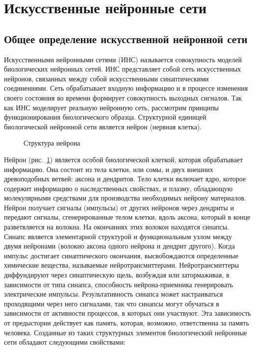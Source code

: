 \section{Искусственные нейронные сети}
\subsection{Общее определение искусственной нейронной сети}

Искусственными нейронными сетями (ИНС) называется совокупность моделей биологических нейронных сетей.
ИНС представляет собой сеть искусственных нейронов, связанных между собой искусственными синаптическими соединениями.
Сеть обрабатывает входную информацию и в процессе изменения своего состояния во времени формирует совокупность выходных сигналов.\cite{COURSE}
Так как ИНС моделирует реальную нейронную сеть, рассмотрим принципы функционирования биологического образца.
Структурной единицей биологической нейронной сети является нейрон (нервная клетка).
\begin{figure}[h]
\caption{Структура нейрона}
\label{ris:neuron}
\end{figure}
Нейрон (рис.~\ref{ris:neuron}) является особой биологической клеткой, которая обрабатывает информацию.
Она состоит из тела клетки, или сомы, и двух внешних древоподобных ветвей: аксона и дендритов.
Тело клетки включает ядро, которое содержит информацию о наследственных свойствах, и плазму, обладающую молекулярными средствами для производства необходимых нейрону материалов.
Нейрон получает сигналы (импульсы) от других нейронов через дендриты и передают сигналы, сгенерированные телом клетки, вдоль аксона, который в конце разветвляется на волокна.
На окончаниях этих волокон находятся синапсы. 
Синапс является элементарной структурой и функциональным узлом между двумя нейронами (волокно аксона одного нейрона и дендрит другого).
Когда импульс достигает синаптического окончания, высвобождаются определенные химические вещества, называемые нейротрансмиттерами.
Нейротрансмиттеры диффундируют через синаптическую щель, возбуждая или затормаживая, в зависимости от типа синапса, способность нейрона-приемника генерировать электрические импульсы.
Результативность синапса может настраиваться проходящими через него сигналами, так что синапсы могут обучаться в зависимости от активности процессов, в которых они участвуют.
Эта зависимость от предыстории действует как память, которая, возможно, ответственна за память человека.
\cite{nn_int_jain}
Созданные из таких структурных элементов биологический нейронные сети обладают следующими свойствами:

